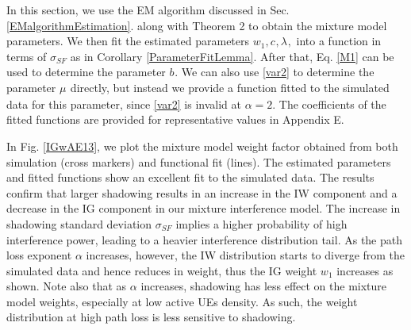 \documentclass[12pt, draftclsnofoot, onecolumn]{IEEEtran}
\theoremstyle{plain}
\begin{document}
In this section, we use the EM algorithm discussed in Sec. \ref{EMalgorithmEstimation}. along with Theorem 2 to obtain the mixture model parameters. We then fit the estimated parameters $w_1, {{c_{}}}, {{\lambda_{}}}, $ into a function in terms of $\sigma_{SF}$ as in 
Corollary \ref{ParameterFitLemma}. After that, Eq. \eqref{M1} can be used to determine the parameter ${{b_{}}}$. We can also use \eqref{var2}
to determine the parameter ${{\mu_{}}}$ directly, but instead we provide a function fitted to the simulated data for this parameter, since \eqref{var2} is invalid at $\alpha=2$. 
The coefficients of the fitted functions are provided for representative values in Appendix E. %

In Fig. \ref{IGwAE13}, we plot the mixture model weight factor obtained from both simulation (cross markers) and functional fit (lines). 
The estimated parameters and fitted functions show an excellent fit to the simulated data. The results confirm that larger shadowing results in an increase in the IW component and a decrease in the IG component in our mixture interference model. The increase in shadowing standard deviation $\sigma_{SF}$ implies a higher probability of high interference power, leading to a heavier interference distribution tail.
As the path loss exponent $\alpha$ increases, however, the IW distribution starts to diverge from the simulated data and hence reduces in weight, thus the IG weight $w_1$ increases as shown. Note also that as $\alpha$ increases, shadowing has less effect on the mixture model weights, especially at low active UEs density. As such, the weight distribution at high path loss is less sensitive to shadowing.  
\end{document}
